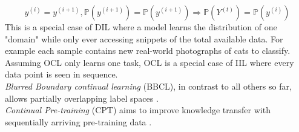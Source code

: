 \begin{equation}
	y^{(i)}=y^{(i+1)}, \mathbb{P}(y^{(i+1)}) = \mathbb{P}(y^{(i+1)}) \Rightarrow \mathbb{P}(Y^{(t)})=\mathbb{P}(y^{(i)})
\end{equation}
This is a special case of DIL where a model learns the distribution of one "domain" while only ever accessing snippets of the total available data. For example each sample contains new real-world photographs of cats to classify. Assuming OCL only learns one task, OCL is a special case of IIL where every data point is seen in sequence.\\
\textit{Blurred Boundary continual learning} (BBCL), in contrast to all others so far, allows partially overlapping label spaces \cite{bidaki2025,LW}.\\
\textit{Continual Pre-training} (CPT) aims to improve knowledge transfer with sequentially arriving pre-training data \cite{bidaki2025, LW}.